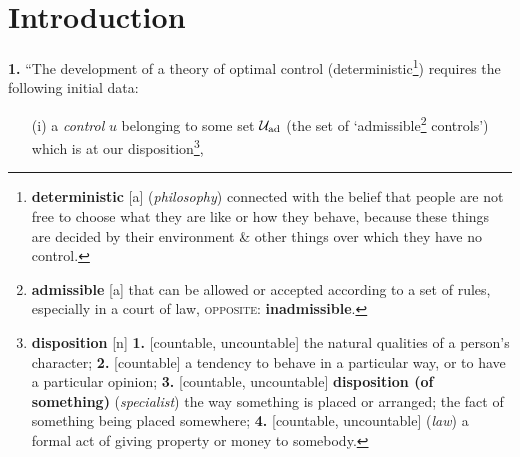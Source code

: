 \documentclass[oneside]{book}
\numberwithin{equation}{section}
\begin{document}
\section*{Introduction}
\textbf{1.} ``The development of a theory of optimal control (deterministic\footnote{\textbf{deterministic} [a] (\textit{philosophy}) connected with the belief that people are not free to choose what they are like or how they behave, because these things are decided by their environment \& other things over which they have no control.}) requires the following initial data:
\begin{itemize}
	\item[(i)] a \textit{control} $u$ belonging to some set $\mathcal{U}_{\rm ad}$ (the set of `admissible\footnote{\textbf{admissible} [a] that can be allowed or accepted according to a set of rules, especially in a court of law, \textsc{opposite}: \textbf{inadmissible}.} controls') which is at our disposition\footnote{\textbf{disposition} [n] \textbf{1.} [countable, uncountable] the natural qualities of a person's character; \textbf{2.} [countable] a tendency to behave in a particular way, or to have a particular opinion; \textbf{3.} [countable, uncountable] \textbf{disposition (of something)} (\textit{specialist}) the way something is placed or arranged; the fact of something being placed somewhere; \textbf{4.} [countable, uncountable] (\textit{law}) a formal act of giving property or money to somebody.},

\end{itemize}
\end{document}
